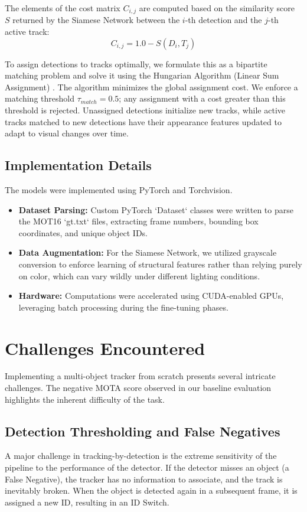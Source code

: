 \documentclass[11pt, letterpaper]{article}
\begin{document}
The elements of the cost matrix $C_{i,j}$ are computed based on the similarity score $S$ returned by the Siamese Network between the $i$-th detection and the $j$-th active track:
\begin{equation}
C_{i,j} = 1.0 - S(D_i, T_j)
\end{equation}

To assign detections to tracks optimally, we formulate this as a bipartite matching problem and solve it using the Hungarian Algorithm (Linear Sum Assignment) \cite{kuhn1955hungarian}. The algorithm minimizes the global assignment cost. We enforce a matching threshold $\tau_{match} = 0.5$; any assignment with a cost greater than this threshold is rejected. Unassigned detections initialize new tracks, while active tracks matched to new detections have their appearance features updated to adapt to visual changes over time.

\subsection{Implementation Details}
The models were implemented using PyTorch and Torchvision. 
\begin{itemize}
    \item \textbf{Dataset Parsing:} Custom PyTorch `Dataset` classes were written to parse the MOT16 `gt.txt` files, extracting frame numbers, bounding box coordinates, and unique object IDs.
    \item \textbf{Data Augmentation:} For the Siamese Network, we utilized grayscale conversion to enforce learning of structural features rather than relying purely on color, which can vary wildly under different lighting conditions.
    \item \textbf{Hardware:} Computations were accelerated using CUDA-enabled GPUs, leveraging batch processing during the fine-tuning phases.
\end{itemize}

\section{Challenges Encountered}

Implementing a multi-object tracker from scratch presents several intricate challenges. The negative MOTA score observed in our baseline evaluation highlights the inherent difficulty of the task.

\subsection{Detection Thresholding and False Negatives}
A major challenge in tracking-by-detection is the extreme sensitivity of the pipeline to the performance of the detector. If the detector misses an object (a False Negative), the tracker has no information to associate, and the track is inevitably broken. When the object is detected again in a subsequent frame, it is assigned a new ID, resulting in an ID Switch. 
\end{document}
